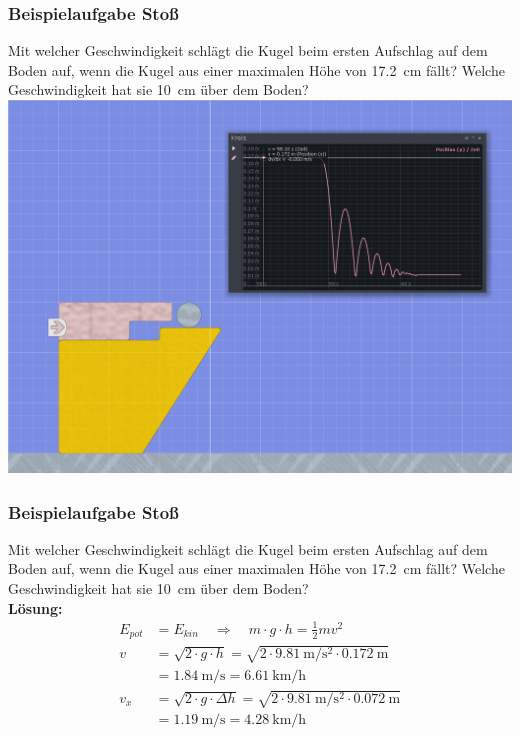 \documentclass{article}
\begin{document}
\frame
{
  \frametitle{Beispielaufgabe Stoß}
Mit welcher Geschwindigkeit schlägt die Kugel beim ersten Aufschlag auf dem Boden auf, wenn die Kugel aus einer maximalen Höhe von \SI{17,2}{\centi\meter} fällt? Welche Geschwindigkeit hat sie \SI{10}{\centi\meter} über dem Boden?\\
  \includegraphics[scale=0.2]{Stoß_Aufgabe.png}
}
\frame
{
\frametitle{Beispielaufgabe Stoß}
Mit welcher Geschwindigkeit schlägt die Kugel beim ersten Aufschlag auf dem Boden auf, wenn die Kugel aus einer maximalen Höhe von \SI{17,2}{\centi\meter} fällt? Welche Geschwindigkeit hat sie \SI{10}{\centi\meter} über dem Boden?\\
	\textbf{Lösung:}	
	\begin{align*}
	E_{pot}&=E_{kin}\quad\Rightarrow\quad m\cdot g\cdot h=\frac{1}{2}mv^2\\
	v&=\sqrt{2\cdot g\cdot h}=\sqrt{2\cdot \SI{9,81}{\meter\per\square\second}\cdot \SI{0,172}{\meter}}\\
	&=\SI{1,84}{\meter\per\second}=\SI{6,61}{\kilo\meter\per\hour}\\
	v_x&=\sqrt{2\cdot g\cdot\Delta h}=\sqrt{2\cdot \SI{9,81}{\meter\per\square\second}\cdot\SI{0,072}{\meter}}\\
	&=\SI{1,19}{\meter\per\second}=\SI{4,28}{\kilo\meter\per\hour}
	\end{align*}
}
\end{document}
